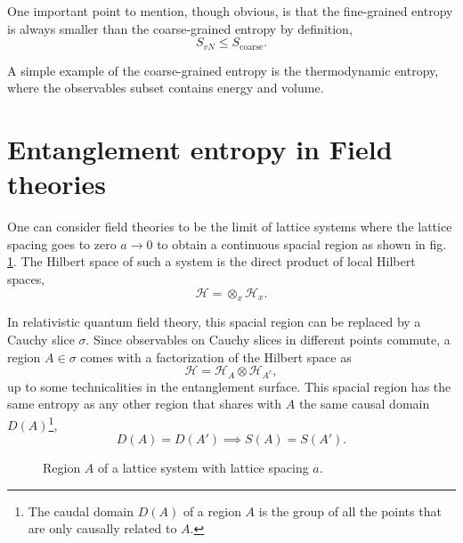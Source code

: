 One important point to mention, though obvious, is that the fine-grained entropy is always smaller than the coarse-grained entropy by definition,
\begin{equation}
    S_{vN}\leq S_{\text{coarse}}.    
\end{equation}

A simple example of the coarse-grained entropy is the thermodynamic entropy, where the observables subset contains energy and volume.

\section{Entanglement entropy in Field theories}

One can consider field theories to be the limit of lattice systems where the lattice spacing goes to zero $a\rightarrow0$ to obtain a continuous spacial region as shown in fig. \ref{lattice system}. The Hilbert space of such a system is the direct product of local Hilbert spaces,
\begin{equation}
    \mathcal{H} = \otimes_{x}\mathcal{H}_x.
\end{equation}

In relativistic quantum field theory, this spacial region can be replaced by a Cauchy slice $\sigma$. Since observables on Cauchy slices in different points commute, a region $A\in\sigma$ comes with a factorization of the Hilbert space as
\begin{equation}
    \mathcal{H} = \mathcal{H}_{A} \otimes \mathcal{H}_{A^c},
\end{equation}
up to some technicalities in the entanglement surface. This spacial region has the same entropy as any other region that shares with $A$ the same causal domain $D(A)$\footnote{The caudal domain $D(A)$ of a region $A$ is the group of all the points that are only causally related to $A$.},
\begin{equation}
    D(A) = D(A') \implies S(A) = S(A').
\end{equation}

\begin{figure}
    \centering
    \caption{Region $A$ of a lattice system with lattice spacing $a$.}
    \label{lattice system}
\end{figure}

